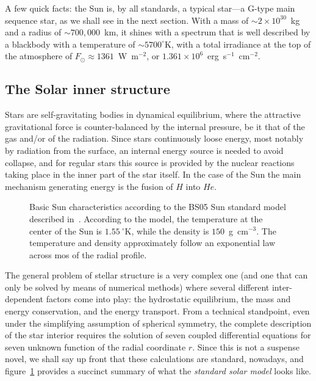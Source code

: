 
A few quick facts: the Sun is, by all standards, a typical star---a G-type main
sequence star, as we shall see in the next section. With a mass of $\sim 2 \times 10^{30}$~kg and
a radius of $\sim 700,000$~km, it shines with a spectrum that is well described by
a blackbody with a temperature of $\sim 5700^\circ$K, with a total irradiance at
the top of the atmosphere of $F_\odot \approx 1361$~W~m$^{-2}$, or
$1.361 \times 10^6$~erg~s$^{-1}$~cm$^{-2}$.


\subsection{The Solar inner structure}

Stars are self-gravitating bodies in dynamical equilibrium, where the attractive
gravitational force is counter-balanced by the internal pressure, be it that of
the gas and/or of the radiation. Since stars continuously loose energy, most notably
by radiation from the surface, an internal energy source is needed to avoid collapse,
and for regular stars this source is provided by the nuclear reactions taking place
in the inner part of the star itself. In the case of the Sun the main mechanism
generating energy is the fusion of $H$ into $He$.


\begin{figure}[htbp!]
	
	\caption{Basic Sun characteristics according to the BS05 Sun standard model
  described in~\cite{2005ApJ...621L..85B}. According to the model, the temperature
  at the center of the Sun is $1.55~^\circ$K, while the density is $150$~g~cm$^{-3}$.
  The temperature and density approximately follow an exponential law across mos
  of the radial profile.}
    \label{fig:sun_standard_model}
\end{figure}

The general problem of stellar structure is a very complex one (and one that can
only be solved by means of numerical methods) where several different inter-dependent
factors come into play: the hydrostatic equilibrium, the mass and energy conservation,
and the energy transport. From a technical standpoint, even under the simplifying
assumption of spherical symmetry, the complete description of the star interior
requires the solution of seven coupled differential equations for seven unknown
function of the radial coordinate $r$. Since this is not a suspense novel, we
shall say up front that these calculations are standard, nowadays, and
figure~\ref{fig:sun_standard_model} provides a succinct summary of what the
\emph{standard solar model} looks like.

